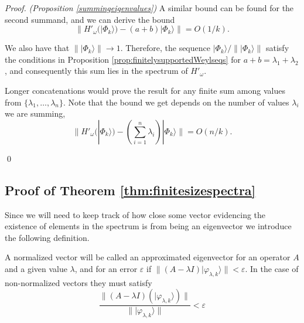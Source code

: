 \documentclass[cmp]{svjour}
\newcommand{\w}{\omega}
\newcommand{\ket}[1]{|#1\rangle}
\begin{document}
\begin{proof} {\it (Proposition \ref{summingeigenvalues})}
    A similar bound can be found for the second summand, and we can derive the bound
    \[
        \|H'_\w(\ket{\Phi_k}) -(a+b)\ket{\Phi_k}\|=O(1/k).
    \]

    We also have that $\|\ket{\Phi_k}\|\to 1$. Therefore, the sequence $\ket{\Phi_k}/\|\ket{\Phi_k}\|$ satisfy the conditions in Proposition \ref{prop:finitelysupportedWeylseqs} for $a+b=\lambda_1+\lambda_2$, and consequently this sum lies in the spectrum of $H'_\w$.

    Longer concatenations would prove the result for any finite sum among values from $\{\lambda_1,\dots,\lambda_n\}$. Note that the bound we get depends on the number of values $\lambda_i$ we are summing,
    \[
        \|H'_\w(\ket{\Phi_k}) -(\sum_{i=1}^n\lambda_i)\ket{\Phi_k}\|=O(n/k).
    \]

    \hspace*{\fill}\qed
\end{proof}











\subsection*{Proof of Theorem \ref{thm:finitesizespectra}}




Since we will need to keep track of how close some vector evidencing the existence of elements in the spectrum is from being an eigenvector we introduce the following definition.


\begin{definition}\label{definition:almosteigenvecto}A normalized vector will be called an approximated eigenvector for an operator $A$ and a given value $\lambda$, and for an error $\varepsilon$ if $\|(A -\lambda I ) \ket{\varphi_{\lambda,k}} \|<\varepsilon$. In the case of non-normalized vectors they must satisfy
    \[
        \frac{\|(A -\lambda I ) (\ket{\varphi_{\lambda,k}}) \|}{\|\ket{\varphi_{\lambda,k}}\|}<\varepsilon
    \]
\end{definition}
\end{document}

